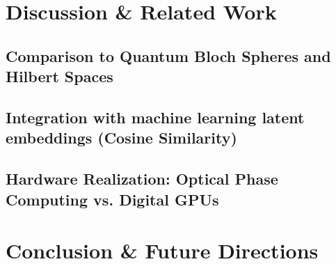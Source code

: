 \documentclass[12pt, a4paper]{article}
\begin{document}
\section{Discussion \& Related Work}
\subsection{Comparison to Quantum Bloch Spheres and Hilbert Spaces}
\subsection{Integration with machine learning latent embeddings (Cosine Similarity)}
\subsection{Hardware Realization: Optical Phase Computing vs. Digital GPUs}

\section{Conclusion \& Future Directions}
\end{document}
